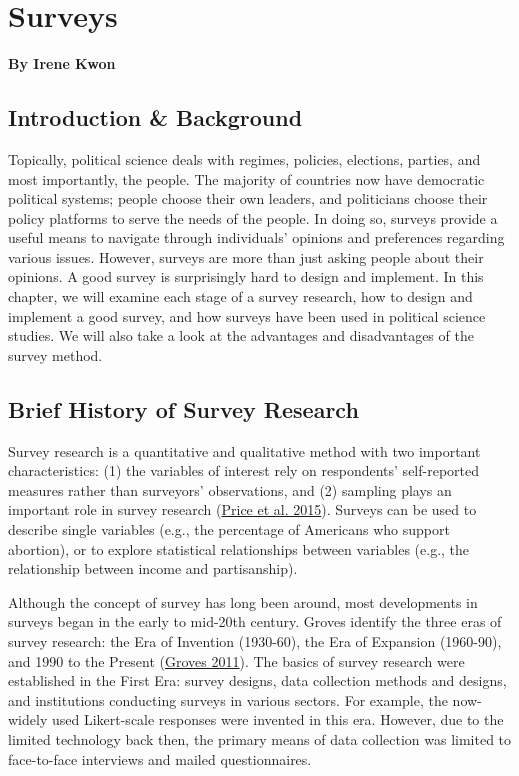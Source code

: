 \documentclass{book}
\begin{document}
\hypertarget{surveys}{%
\chapter{Surveys}\label{surveys}}

\textbf{By Irene Kwon}

\hypertarget{introduction-background}{%
\section{Introduction \& Background}\label{introduction-background}}

Topically, political science deals with regimes, policies, elections, parties,
and most importantly, the people. The majority of countries now have
democratic political systems; people choose their own leaders, and politicians
choose their policy platforms to serve the needs of the people. In doing so,
surveys provide a useful means to navigate through individuals' opinions and
preferences regarding various issues. However, surveys are more than just
asking people about their opinions. A good survey is surprisingly hard to
design and implement. In this chapter, we will examine each stage of a survey
research, how to design and implement a good survey, and how surveys have been
used in political science studies. We will also take a look at the advantages
and disadvantages of the survey method.

\hypertarget{brief-history-of-survey-research}{%
\section{Brief History of Survey
Research}\label{brief-history-of-survey-research}}

Survey research is a quantitative and qualitative method with two important
characteristics: (1) the variables of interest rely on respondents'
self-reported measures rather than surveyors' observations, and (2) sampling
plays an important role in survey research
(\protect\hyperlink{ref-price2015research}{Price et al. 2015}). Surveys can be
used to describe single variables (e.g., the percentage of Americans who
support abortion), or to explore statistical relationships between variables
(e.g., the relationship between income and partisanship).

Although the concept of survey has long been around, most developments in
surveys began in the early to mid-20th century. Groves identify the three eras
of survey research: the Era of Invention (1930-60), the Era of Expansion
(1960-90), and 1990 to the Present
(\protect\hyperlink{ref-groves2011three}{Groves 2011}). The basics of survey
research were established in the First Era: survey designs, data collection
methods and designs, and institutions conducting surveys in various sectors.
For example, the now-widely used Likert-scale responses were invented in this
era. However, due to the limited technology back then, the primary means of
data collection was limited to face-to-face interviews and mailed
questionnaires.
\end{document}
